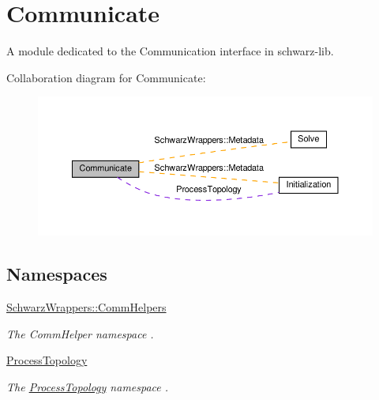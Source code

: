 \hypertarget{group__comm}{}\section{Communicate}
\label{group__comm}


A module dedicated to the Communication interface in schwarz-\/lib.  


Collaboration diagram for Communicate\+:
\nopagebreak
\begin{figure}[H]
\begin{center}
\leavevmode
\includegraphics[width=350pt]{group__comm}
\end{center}
\end{figure}
\subsection*{Namespaces}
\begin{DoxyCompactItemize}
\item 
 \hyperlink{namespaceSchwarzWrappers_1_1CommHelpers}{Schwarz\+Wrappers\+::\+Comm\+Helpers}
\begin{DoxyCompactList}\small\item\em The Comm\+Helper namespace . \end{DoxyCompactList}\item 
 \hyperlink{namespaceProcessTopology}{Process\+Topology}
\begin{DoxyCompactList}\small\item\em The \hyperlink{namespaceProcessTopology}{Process\+Topology} namespace . \end{DoxyCompactList}\end{DoxyCompactItemize}
